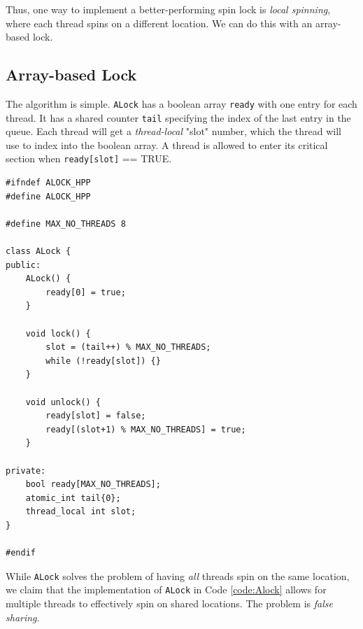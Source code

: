 Thus, one way to implement a better-performing spin lock is \textit{local spinning}, where each thread spins on a different location. We can do this with an array-based lock.

\subsection{Array-based Lock}
The algorithm is simple. \verb|ALock| has a boolean array \verb|ready| with one entry for each thread. It has a shared counter \verb|tail| specifying the index of the last entry in the queue. Each thread will get a \textit{thread-local} "slot" number, which the thread will use to index into the boolean array. A thread is allowed to enter its critical section when \verb|ready[slot]| == TRUE.

\makebox[\linewidth]{\rule{17cm}{0.4pt}}
{\centering \label{code:Alock}
\begin{verbatim}
#ifndef ALOCK_HPP
#define ALOCK_HPP

#define MAX_NO_THREADS 8

class ALock {
public:
    ALock() {
        ready[0] = true;
    }

    void lock() {
        slot = (tail++) % MAX_NO_THREADS;
        while (!ready[slot]) {}
    }

    void unlock() {
        ready[slot] = false;
        ready[(slot+1) % MAX_NO_THREADS] = true;
    }

private:
    bool ready[MAX_NO_THREADS];
    atomic_int tail{0};
    thread_local int slot;
}

#endif
\end{verbatim}
\makebox[\linewidth]{\rule{17cm}{0.4pt}}
}

While \verb|ALock| solves the problem of having \textit{all} threads spin on the same location, we claim that the implementation of \verb|ALock| in Code \ref{code:Alock} allows for multiple threads to effectively spin on shared locations. The problem is \textit{false sharing}.

